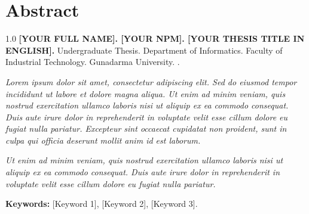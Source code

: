 \section*{Abstract}
\thispagestyle{plain}

\justify
\begin{spacing}{1.0}
	\textbf{[YOUR FULL NAME]. [YOUR NPM]. [YOUR THESIS TITLE IN ENGLISH].} Undergraduate Thesis. Department of Informatics. Faculty of Industrial Technology. Gunadarma University. \the\year.
\end{spacing}

\vspace{0.5cm}

\justify
\textit{Lorem ipsum dolor sit amet, consectetur adipiscing elit. Sed do eiusmod tempor incididunt ut labore et dolore magna aliqua. Ut enim ad minim veniam, quis nostrud exercitation ullamco laboris nisi ut aliquip ex ea commodo consequat. Duis aute irure dolor in reprehenderit in voluptate velit esse cillum dolore eu fugiat nulla pariatur. Excepteur sint occaecat cupidatat non proident, sunt in culpa qui officia deserunt mollit anim id est laborum.}

\textit{Ut enim ad minim veniam, quis nostrud exercitation ullamco laboris nisi ut aliquip ex ea commodo consequat. Duis aute irure dolor in reprehenderit in voluptate velit esse cillum dolore eu fugiat nulla pariatur.}

\vspace{0.5cm}
\textbf{Keywords:} [Keyword 1], [Keyword 2], [Keyword 3].
